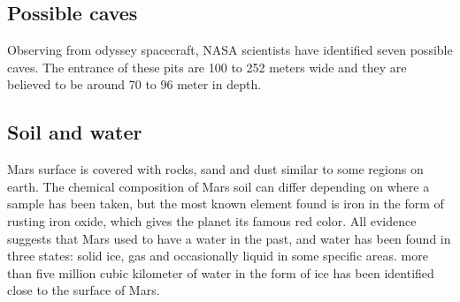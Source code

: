 \subsection{Possible caves}
Observing from odyssey spacecraft, NASA scientists have identified seven possible caves. The entrance of these pits are 100 to 252 meters wide and they are believed to be around 70 to 96 meter in depth\cite{surface}\cite{guide}.

\subsection{Soil and water}
Mars surface is covered with rocks, sand and dust similar to some regions on earth.
The chemical composition of Mars soil can differ depending on where a sample has been taken, but the most known element found is iron in the form of rusting iron oxide, which gives the planet its famous red color.
\newline All evidence suggests that Mars used to have a water in the past, and water has been found in three states: solid ice, gas and occasionally liquid in some specific areas\cite{liquid}.
more than five million cubic kilometer of water in the form of ice  has been identified close to the surface of Mars\cite{water}.

